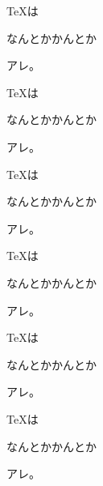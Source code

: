 \documentclass{article}
\begin{document}
{\TeX}は\parbox[t]{3zw}{なんとかかんとか}アレ。
\par\medskip
{\TeX}は\parbox[c]{3zw}{なんとかかんとか}アレ。
\par\medskip
{\TeX}は\parbox[b]{3zw}{なんとかかんとか}アレ。
\par\medskip

{\TeX}は\begin{minipage}[t]{3zw}なんとかかんとか\end{minipage}アレ。
\par\medskip
{\TeX}は\begin{minipage}[c]{3zw}なんとかかんとか\end{minipage}アレ。
\par\medskip
{\TeX}は\begin{minipage}[b]{3zw}なんとかかんとか\end{minipage}アレ。
\par\medskip
\end{document}
